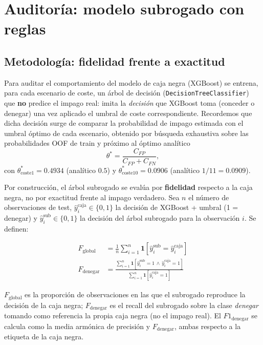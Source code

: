 \documentclass[11pt,a4paper]{article}
\begin{document}
\section{Auditoría: modelo subrogado con reglas}

\subsection{Metodología: fidelidad frente a exactitud}

Para auditar el comportamiento del modelo de caja negra (XGBoost) se entrena, para cada escenario de coste, un árbol de decisión (\texttt{DecisionTreeClassifier}) que \textbf{no} predice el impago real: imita la \emph{decisión} que XGBoost toma (conceder o denegar) una vez aplicado el umbral de coste correspondiente. Recordemos que dicha decisión surge de comparar la probabilidad de impago estimada con el umbral óptimo de cada escenario, obtenido por búsqueda exhaustiva sobre las probabilidades OOF de train y próximo al óptimo analítico
\[
\theta^{*} = \frac{C_{FP}}{C_{FP}+C_{FN}},
\]
con $\theta^{*}_{\text{coste1}}=0.4934$ (analítico $0.5$) y $\theta^{*}_{\text{coste10}}=0.0906$ (analítico $1/11=0.0909$).

Por construcción, el árbol subrogado se evalúa por \textbf{fidelidad} respecto a la caja negra, no por exactitud frente al impago verdadero. Sea $n$ el número de observaciones de test, $\hat y_i^{\text{caja}}\in\{0,1\}$ la decisión de XGBoost + umbral (1 = denegar) y $\hat y_i^{\text{sub}}\in\{0,1\}$ la decisión del árbol subrogado para la observación $i$. Se definen:

\begin{align}
F_{\text{global}} &= \frac{1}{n}\sum_{i=1}^{n} \mathbf{1}\!\left[\hat y_i^{\text{sub}} = \hat y_i^{\text{caja}}\right] \\
F_{\text{denegar}} &= \frac{\sum_{i=1}^{n} \mathbf{1}\!\left[\hat y_i^{\text{sub}}=1 \,\wedge\, \hat y_i^{\text{caja}}=1\right]}{\sum_{i=1}^{n} \mathbf{1}\!\left[\hat y_i^{\text{caja}}=1\right]}
\end{align}

$F_{\text{global}}$ es la proporción de observaciones en las que el subrogado reproduce la decisión de la caja negra; $F_{\text{denegar}}$ es el recall del subrogado sobre la clase \emph{denegar} tomando como referencia la propia caja negra (no el impago real). El $F1_{\text{denegar}}$ se calcula como la media armónica de precisión y $F_{\text{denegar}}$, ambas respecto a la etiqueta de la caja negra.
\end{document}

